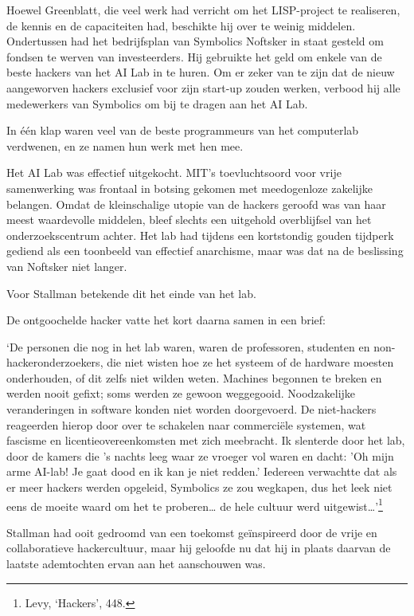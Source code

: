 \documentclass[
  a5paper,
  smalldemyvopaper,11pt,twoside,onecolumn,openright,extrafontsizes]{memoir}
\begin{document}
Hoewel Greenblatt, die veel werk had verricht om het LISP-project te
realiseren, de kennis en de capaciteiten had, beschikte hij over te
weinig middelen. Ondertussen had het bedrijfsplan van Symbolics Noftsker
in staat gesteld om fondsen te werven van investeerders. Hij gebruikte
het geld om enkele van de beste hackers van het AI Lab in te huren. Om
er zeker van te zijn dat de nieuw aangeworven hackers exclusief voor
zijn start-up zouden werken, verbood hij alle medewerkers van Symbolics
om bij te dragen aan het AI Lab.

In één klap waren veel van de beste programmeurs van het computerlab
verdwenen, en ze namen hun werk met hen mee.

Het AI Lab was effectief uitgekocht. MIT's toevluchtsoord voor vrije
samenwerking was frontaal in botsing gekomen met meedogenloze zakelijke
belangen. Omdat de kleinschalige utopie van de hackers geroofd was van
haar meest waardevolle middelen, bleef slechts een uitgehold
overblijfsel van het onderzoekscentrum achter. Het lab had tijdens een
kortstondig gouden tijdperk gediend als een toonbeeld van effectief
anarchisme, maar was dat na de beslissing van Noftsker niet langer.

Voor Stallman betekende dit het einde van het lab.

De ontgoochelde hacker vatte het kort daarna samen in een brief:

`De personen die nog in het lab waren, waren de professoren, studenten
en non-hackeronderzoekers, die niet wisten hoe ze het systeem of de
hardware moesten onderhouden, of dit zelfs niet wilden weten. Machines
begonnen te breken en werden nooit gefixt; soms werden ze gewoon
weggegooid. Noodzakelijke veranderingen in software konden niet worden
doorgevoerd. De niet-hackers reageerden hierop door over te schakelen
naar commerciële systemen, wat fascisme en licentieovereenkomsten met
zich meebracht. Ik slenterde door het lab, door de kamers die 's nachts
leeg waar ze vroeger vol waren en dacht: 'Oh mijn arme AI-lab! Je gaat
dood en ik kan je niet redden.' Iedereen verwachtte dat als er meer
hackers werden opgeleid, Symbolics ze zou wegkapen, dus het leek niet
eens de moeite waard om het te proberen\ldots{} de hele cultuur werd
uitgewist\ldots'\footnote{\hspace{0pt}Levy, `Hackers', 448.}

Stallman had ooit gedroomd van een toekomst geïnspireerd door de vrije
en collaboratieve hackercultuur, maar hij geloofde nu dat hij in plaats
daarvan de laatste ademtochten ervan aan het aanschouwen was.
\end{document}
